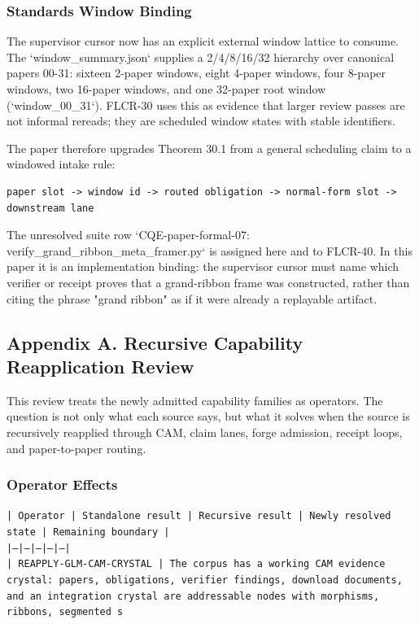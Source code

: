 \documentclass[11pt]{article}
\begin{document}
\subsubsection*{Standards Window Binding}

The supervisor cursor now has an explicit external window lattice to consume.
The `window\_summary.json` supplies a 2/4/8/16/32 hierarchy over canonical
papers 00-31: sixteen 2-paper windows, eight 4-paper windows, four 8-paper
windows, two 16-paper windows, and one 32-paper root window
(`window\_00\_31`). FLCR-30 uses this as evidence that larger review passes are
not informal rereads; they are scheduled window states with stable identifiers.

The paper therefore upgrades Theorem 30.1 from a general scheduling claim to a
windowed intake rule:

\begin{verbatim}
paper slot -> window id -> routed obligation -> normal-form slot -> downstream lane
\end{verbatim}

The unresolved suite row `CQE-paper-formal-07: verify\_grand\_ribbon\_meta\_framer.py`
is assigned here and to FLCR-40. In this paper it is an implementation binding:
the supervisor cursor must name which verifier or receipt proves that a
grand-ribbon frame was constructed, rather than citing the phrase "grand ribbon"
as if it were already a replayable artifact.

\subsection*{Appendix A. Recursive Capability Reapplication Review}

This review treats the newly admitted capability families as operators. The question is not only what each source says, but what it solves when the source is recursively reapplied through CAM, claim lanes, forge admission, receipt loops, and paper-to-paper routing.

\subsubsection*{Operator Effects}

\noindent\texttt{| Operator | Standalone result | Recursive result | Newly resolved state | Remaining boundary |}\\
\noindent\texttt{|---|---|---|---|---|}\\
\noindent\texttt{| REAPPLY-GLM-CAM-CRYSTAL | The corpus has a working CAM evidence crystal: papers, obligations, verifier findings, download documents, and an integration crystal are addressable nodes with morphisms, ribbons, segmented s}\\
\end{document}

